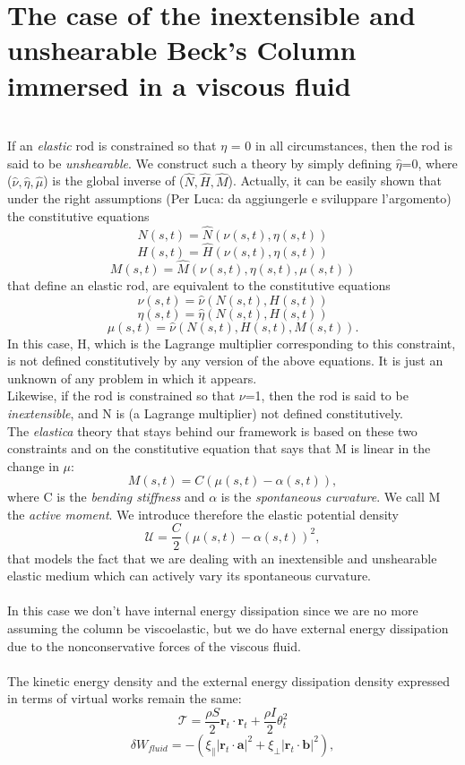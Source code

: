 
\section{The case of the inextensible and unshearable Beck's Column immersed in a viscous fluid }

\\
If an \emph{elastic} rod is constrained so that $\eta$ = 0 in all circumstances, then the rod is said to be \emph{unshearable}.
We construct such a theory by simply defining $\hat{\eta}$=0, where ($\hat{\nu},\hat{\eta},\hat{\mu}$) is the global inverse of ($\hat{N},\hat{H},\hat{M}$). Actually, it can be easily shown that under the right assumptions (Per Luca: da aggiungerle e sviluppare l'argomento) the constitutive equations 
\[  N (s,t)=  \hat{N}(\nu (s,t),\eta (s,t))
\]
\[  H (s,t)=  \hat{H}(\nu (s,t),\eta (s,t)) 
\]
\[  M (s,t)=  \hat{M}(\nu (s,t),\eta (s,t), \mu(s,t))
\]
that define an elastic rod, are equivalent to the constitutive equations
\[  \nu (s,t)=  \hat{\nu}(N(s,t),H(s,t))
\]
\[  \eta (s,t)=  \hat{\eta}(N(s,t),H(s,t)) 
\]
\[  \mu (s,t)=  \hat{\nu}(N(s,t), H(s,t), M(s,t)).
\]
In this case, H, which is the Lagrange multiplier corresponding to this constraint, is not defined constitutively by any version of the above equations. It is just an unknown of any problem in which it appears.
\\
Likewise, if the rod is constrained so that $\nu$=1, then the rod is said to be \emph{inextensible}, and N is (a Lagrange multiplier) not defined constitutively.\\
The \emph{elastica} theory that stays behind our framework is based on these two constraints and on the constitutive equation that says that M is linear in the change in $\mu$:
\[
M(s,t) = C(\mu(s,t) − \alpha(s,t)),
\]
where C is the \emph{bending stiffness} and $\alpha$ is the \emph{spontaneous curvature}. We call M the \emph{active moment}. We introduce therefore the elastic potential density 
\[ \mathcal{U} = \frac{C}{2}(\mu(s,t) − \alpha(s,t))^2,\]
that models the fact that we are dealing with an inextensible and unshearable elastic medium which can actively vary its spontaneous curvature.
\\\\
In this case we don't have internal energy dissipation since we are no more assuming the column be viscoelastic, but we do have external energy dissipation due to the nonconservative forces of the viscous fluid.
\\\\
The kinetic energy density and the external energy dissipation density expressed in terms of virtual works remain the same:
\[
\mathcal{T} = \frac{\rho S}{2}\mathbf{r}_t \cdot \mathbf{r}_t + \frac{\rho I}{2}\theta_t^2
\]
\[ 
\delta W_{fluid}= -(\xi_\parallel\left|\mathbf{r}_t\cdot\mathbf{a}\right|^2 + \xi_\perp \left|\mathbf{r}_t\cdot\mathbf{b}\right|^2),
\]

